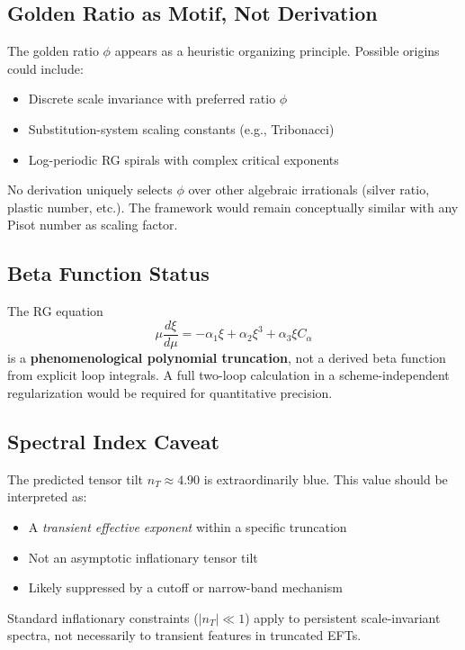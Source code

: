 \subsection*{Golden Ratio as Motif, Not Derivation}
The golden ratio $\phi$ appears as a heuristic organizing principle. Possible origins could include:
\begin{itemize}
    \item Discrete scale invariance with preferred ratio $\phi$
    \item Substitution-system scaling constants (e.g., Tribonacci)
    \item Log-periodic RG spirals with complex critical exponents
\end{itemize}
No derivation uniquely selects $\phi$ over other algebraic irrationals (silver ratio, plastic number, etc.). The framework would remain conceptually similar with any Pisot number as scaling factor.

\subsection*{Beta Function Status}
The RG equation
\[
\mu \frac{d\xi}{d\mu} = -\alpha_1 \xi + \alpha_2 \xi^3 + \alpha_3 \xi C_\alpha
\]
is a \textbf{phenomenological polynomial truncation}, not a derived beta function from explicit loop integrals. A full two-loop calculation in a scheme-independent regularization would be required for quantitative precision.

\subsection*{Spectral Index Caveat}
The predicted tensor tilt $n_T \approx 4.90$ is extraordinarily blue. This value should be interpreted as:
\begin{itemize}
    \item A \textit{transient effective exponent} within a specific truncation
    \item Not an asymptotic inflationary tensor tilt
    \item Likely suppressed by a cutoff or narrow-band mechanism
\end{itemize}
Standard inflationary constraints ($|n_T| \ll 1$) apply to persistent scale-invariant spectra, not necessarily to transient features in truncated EFTs.

